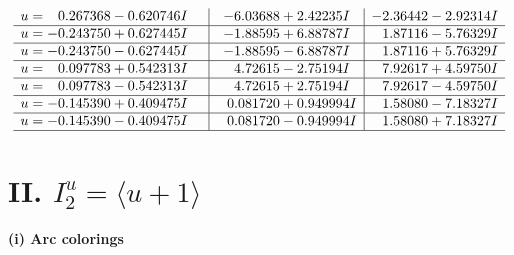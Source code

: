 \documentclass[1p]{elsarticle_modified}
\theoremstyle{definition}
\begin{document}
$$\begin{array}{c|c|c}
\begin{aligned}
u &= \phantom{-}0.267368 - 0.620746 I\end{aligned}
 & -6.03688 + 2.42235 I & -2.36442 - 2.92314 I \\ \hline\begin{aligned}
u &= -0.243750 + 0.627445 I\end{aligned}
 & -1.88595 + 6.88787 I & \phantom{-}1.87116 - 5.76329 I \\ \hline\begin{aligned}
u &= -0.243750 - 0.627445 I\end{aligned}
 & -1.88595 - 6.88787 I & \phantom{-}1.87116 + 5.76329 I \\ \hline\begin{aligned}
u &= \phantom{-}0.097783 + 0.542313 I\end{aligned}
 & \phantom{-}4.72615 - 2.75194 I & \phantom{-}7.92617 + 4.59750 I \\ \hline\begin{aligned}
u &= \phantom{-}0.097783 - 0.542313 I\end{aligned}
 & \phantom{-}4.72615 + 2.75194 I & \phantom{-}7.92617 - 4.59750 I \\ \hline\begin{aligned}
u &= -0.145390 + 0.409475 I\end{aligned}
 & \phantom{-}0.081720 + 0.949994 I & \phantom{-}1.58080 - 7.18327 I \\ \hline\begin{aligned}
u &= -0.145390 - 0.409475 I\end{aligned}
 & \phantom{-}0.081720 - 0.949994 I & \phantom{-}1.58080 + 7.18327 I\\
 \hline 
 \end{array}$$\newpage\newpage\renewcommand{\arraystretch}{1}
\centering \section*{II. $I^u_{2}= \langle u+1 \rangle$}
\flushleft \textbf{(i) Arc colorings}\\
\end{document}
